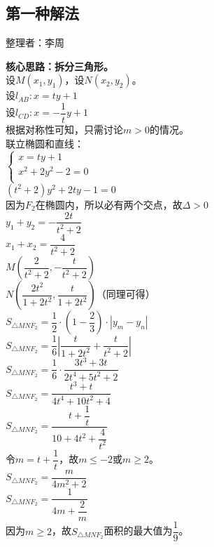 \documentclass[UTF8]{ctexart}
\begin{document}
\subsection{第一种解法}
    \begin{center}
        整理者：李周
    \end{center}
    \begin{multicols}{2}
        \small
        \textbf{核心思路：拆分三角形。}\\[5mm]
        设$M(x_{1},y_{1})$，设$N(x_{2},y_{2})$。\\[5mm]  
        设$l_{AB}:x=ty+1$\\[5mm]
        设$l_{CD}:x=-\dfrac{1}{t}y+1$\\[5mm]
        根据对称性可知，只需讨论$m>0$的情况。\\[5mm]
        联立椭圆和直线：\\[5mm]
        \begin{math}
            \begin{cases}
                x=ty+1\\[1mm]  
                x^2+2y^2-2=0\\[1mm]
            \end{cases}    
        \end{math}\\[5mm]
        $(t^2+2)y^2+2ty-1=0$\\[5mm]
        因为$F_{2}$在椭圆内，所以必有两个交点，故$\Delta >0$\\[5mm]
        $y_{1}+y_{2}=-\dfrac{2t}{t^2+2}$\\[5mm]
        $x_{1}+x_{2}=\dfrac{4}{t^2+2}$\\[5mm]
        $M(\dfrac{2}{t^2+2},-\dfrac{t}{t^2+2})$\\[5mm]
        $N(\dfrac{2t^2}{1+2t^2},\dfrac{t}{1+2t^2})$（同理可得）\\[8mm]
        $S_{\triangle MNF_{2}}=\dfrac{1}{2}\cdot\left(1-\dfrac{2}{3}\right)\cdot\left|y_{m}-y_{n}\right|$\\[4mm]
        $S_{\triangle MNF_{2}}=\dfrac{1}{6}\left|\dfrac{t}{1+2t^2}+\dfrac{t}{t^2+2}\right|$\\[4mm]
        $S_{\triangle MNF_{2}}=\dfrac{1}{6}\cdot\dfrac{3t^3+3t}{2t^4+5t^2+2}$\\[4mm]
        $S_{\triangle MNF_{2}}=\dfrac{t^3+t}{4t^4+10t^2+4}$\\[4mm]
        $S_{\triangle MNF_{2}}=\dfrac{t+\dfrac{1}{t}}{10+4t^2+\dfrac{4}{t^2}}$\\[20mm]
        令$m=t+\dfrac{1}{t}$，故$m\leq -2$或$m\geq 2$。\\[5mm]
        $S_{\triangle MNF_{2}}=\dfrac{m}{4m^2+2}$\\[5mm]
        $S_{\triangle MNF_{2}}=\dfrac{1}{4m+\dfrac{2}{m}}$\\[2mm]
        因为$m\geq 2$，故$S_{\triangle MNF_{2}}$面积的最大值为$\dfrac{1}{9}$。
        \newpage
    \end{multicols}
\end{document}
